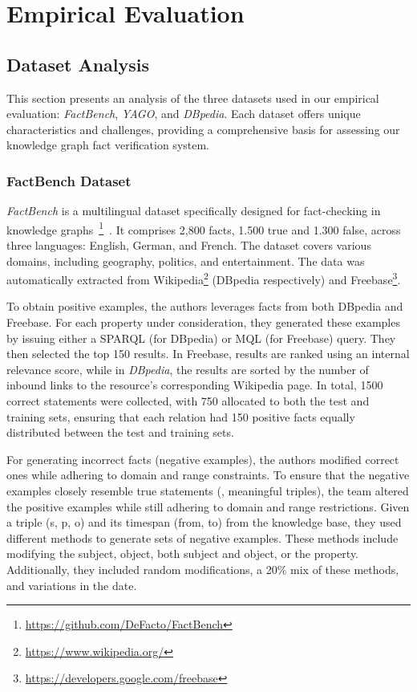 \chapter{Empirical Evaluation}\label{ch:empirical-evaluation}

\section{Dataset Analysis}\label{sec:empirical-evaluation:dataset-analysis}
This section presents an analysis of the three datasets used in our empirical evaluation: \textit{FactBench}, \textit{YAGO}, and \textit{DBpedia}.
Each dataset offers unique characteristics and challenges, providing a comprehensive basis for assessing our knowledge graph fact verification system.
\subsection{FactBench Dataset}\label{subsec:empirical-evaluation:dataset-analysis:factbench}
\textit{FactBench} is a multilingual dataset specifically designed for fact-checking in knowledge graphs~\footnote{\url{https://github.com/DeFacto/FactBench}}~\cite{GERBER201585}.
It comprises 2,800 facts, 1.500 true and 1.300 false, across three languages: English, German, and French.
The dataset covers various domains, including geography, politics, and entertainment.
The data was automatically extracted from Wikipedia\footnote{\url{https://www.wikipedia.org/}} (DBpedia respectively) and Freebase\footnote{\url{https://developers.google.com/freebase}}.

To obtain positive examples, the authors leverages facts from both DBpedia and Freebase.
For each property under consideration, they generated these examples by issuing either a SPARQL (for DBpedia) or MQL (for Freebase) query.
They then selected the top 150 results.
In Freebase, results are ranked using an internal relevance score, while in \textit{DBpedia}, the results are sorted by the number of inbound links to the resource’s corresponding Wikipedia page.
In total, 1500 correct statements were collected, with 750 allocated to both the test and training sets, ensuring that each relation had 150 positive facts equally distributed between the test and training sets.

For generating incorrect facts (negative examples), the authors modified correct ones while adhering to domain and range constraints.
To ensure that the negative examples closely resemble true statements (\ie, meaningful triples), the team altered the positive examples while still adhering to domain and range restrictions.
Given a triple (s, p, o) and its timespan (from, to) from the knowledge base, they used different methods to generate sets of negative examples.
These methods include modifying the subject, object, both subject and object, or the property.
Additionally, they included random modifications, a 20\% mix of these methods, and variations in the date.

